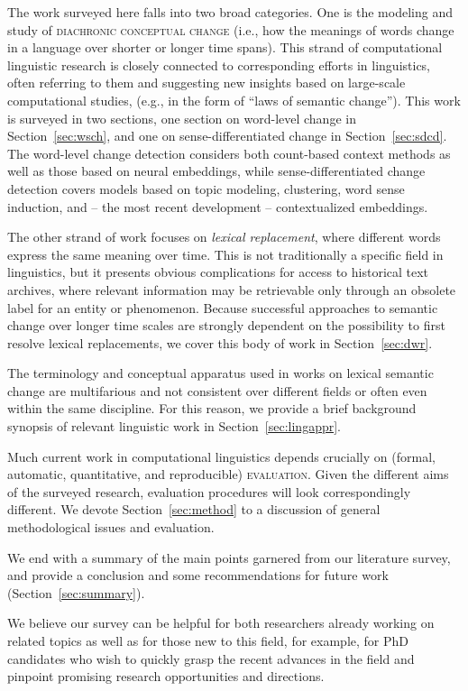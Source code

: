 \documentclass[output=paper]{langsci/langscibook}
\begin{document}
The work surveyed here falls into two broad categories. One is the modeling and study of \textsc{diachronic conceptual change} (i.e., how the meanings of words change in a language over shorter or longer time spans). This strand of computational linguistic research is closely connected to corresponding efforts in linguistics, often referring to them and suggesting new insights based on large-scale computational studies, (e.g., in the form of ``laws of semantic change''). This work is surveyed in two sections, 
one section on word-level change in Section~\ref{sec:wsch}, and one on sense-differentiated change in Section~\ref{sec:sdcd}. The word-level change detection considers both count-based context methods as well as those based on neural embeddings, while sense-differentiated change detection covers models based on topic modeling, clustering, word sense induction,  and -- the most recent development -- contextualized embeddings.\largerpage

The other strand of work focuses on \emph{lexical replacement}, where different words express the same meaning over time. This is not traditionally a specific field in linguistics, but it presents obvious complications for access to historical text archives, where relevant information may be retrievable only through an obsolete label for an entity or phenomenon. Because successful approaches to semantic change over longer time scales are strongly dependent on the possibility to first resolve lexical replacements, we cover this body of work in Section~\ref{sec:dwr}. 


The terminology and conceptual apparatus used in works on lexical semantic change are multifarious and not consistent over different fields or often even within the same discipline. For this reason, we provide a brief background synopsis of relevant linguistic work
 in Section~\ref{sec:lingappr}.

Much current work in computational linguistics depends crucially on (formal, automatic, quantitative, and reproducible) \textsc{evaluation}. Given the different aims of the surveyed research, evaluation procedures will look correspondingly different. We devote Section~\ref{sec:method} to a discussion of general methodological issues and evaluation.


We end with a summary of the main points garnered from our literature survey, and provide a conclusion and some recommendations for future work (Section~\ref{sec:summary}).

We believe our survey can be helpful for both researchers already working on related topics as well as for those new to this field, for example, for PhD candidates who wish to quickly grasp the recent advances in the field and pinpoint promising research opportunities and directions. 
\end{document}
